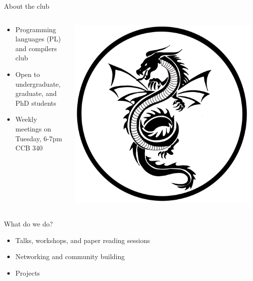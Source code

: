 \documentclass{beamer}
\begin{document}
\begin{frame}{About the club}
  \begin{columns}
    \begin{column}{0.8\textwidth}
      \begin{itemize}
      \item Programming languages (PL) and compilers club
      \item Open to undergraduate, graduate, and PhD students
      \item Weekly meetings on Tuesday, 6-7pm CCB 340
      \end{itemize}
    \end{column}

    \begin{column}{0.15\textwidth}
      \centering
      \includegraphics[width=\textwidth]{assets/dragon.png}
    \end{column}
  \end{columns}
\end{frame}

\begin{frame}{What do we do?}
  \begin{itemize}
  \item Talks, workshops, and paper reading sessions
  \item Networking and community building
  \item Projects
  \end{itemize}
\end{frame}
\end{document}
